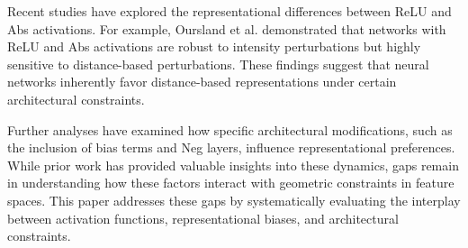 Recent studies have explored the representational differences between ReLU and Abs activations. For example, Oursland et al. \cite{oursland2024neural} demonstrated that networks with ReLU and Abs activations are robust to intensity perturbations but highly sensitive to distance-based perturbations. These findings suggest that neural networks inherently favor distance-based representations under certain architectural constraints.

Further analyses have examined how specific architectural modifications, such as the inclusion of bias terms and Neg layers, influence representational preferences. While prior work has provided valuable insights into these dynamics, gaps remain in understanding how these factors interact with geometric constraints in feature spaces. This paper addresses these gaps by systematically evaluating the interplay between activation functions, representational biases, and architectural constraints.

